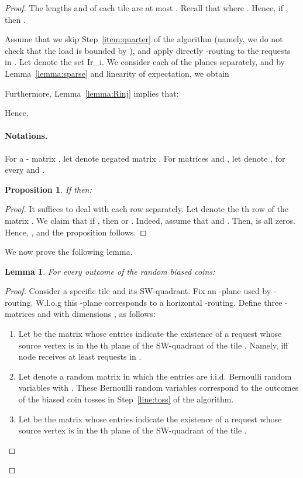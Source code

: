 \documentclass[11pt]{article}
\newtheorem{lemma}[theorem]{Lemma}
\newtheorem{proposition}[theorem]{Proposition}
\newenvironment{proof sketch}[1]{\noindent {\emph{Proof sketch of #1:}}}{\hfill \qed}
\begin{document}
\begin{proof}
The lengths  and  of each tile are at most .  Recall that
 where . Hence,
if , then .

Assume that we skip Step~\ref{item:quarter} of the algorithm (namely, we do not check
that the load is bounded by ), and apply directly -routing to the requests in
. Let  denote the set Ir_i.  We consider each of the  planes separately, and by
Lemma~\ref{lemma:sparse} and linearity of expectation, we obtain


Furthermore, Lemma~\ref{lemma:Rinj} implies that:


Hence,


\paragraph{Notations.}
For a - matrix , let  denote negated matrix
.  For matrices  and , let 
denote , for every  and .

\begin{proposition}\label{proposition:dom}
If   then:
  
\end{proposition}

\begin{proof}
  It suffices to deal with each row separately. Let  denote the th row
  of the matrix . We claim that if , then  or
  .  Indeed, assume that  and
  . Then,  is all zeros. Hence, , and
  the proposition follows.
\end{proof}

\noindent
We now prove the following lemma.
\begin{lemma}\label{lemma:combine}
    For every outcome of the random biased coins:
  
\end{lemma}
\begin{proof}
  Consider a specific tile  and its SW-quadrant.  Fix an -plane used by
  -routing. W.l.o.g this -plane corresponds to a horizontal -routing. Define
  three - matrices  and  with dimensions , as
  follows:
  \begin{enumerate}
  \item Let  be the matrix whose entries indicate the existence of a request  whose source vertex is in the th plane of the SW-quadrant of the tile
    . Namely,  iff node  receives at least  requests in
    .
  \item Let  denote a random matrix in which the entries are i.i.d. Bernoulli
    random variables with . These Bernoulli random variables
    correspond to the outcomes of the biased coin tosses in Step~\ref{line:toss} of
    the algorithm.
  \item Let  be the matrix whose entries indicate the existence of a request  whose source vertex is in the th plane of the SW-quadrant of the
    tile .
  \end{enumerate}



\end{proof}
\end{proof}
\end{document}

